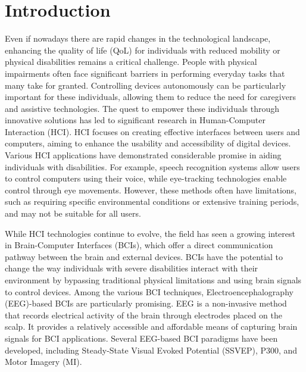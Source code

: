 \chapter{Introduction}\label{ch:introduction}
Even if nowadays there are rapid changes in the technological landscape, enhancing the quality of life (QoL) for individuals with reduced mobility or physical disabilities remains a critical challenge. 
People with physical impairments often face significant barriers in performing everyday tasks that many take for granted. 
Controlling devices autonomously can be particularly important for these individuals, allowing them to reduce the need for caregivers and assistive technologies.
The quest to empower these individuals through innovative solutions has led to significant research in Human-Computer Interaction (HCI).
HCI focuses on creating effective interfaces between users and computers, aiming to enhance the usability and accessibility of digital devices. 
Various HCI applications have demonstrated considerable promise in aiding individuals with disabilities. 
For example, speech recognition systems allow users to control computers using their voice, while eye-tracking technologies enable control through eye movements. 
However, these methods often have limitations, such as requiring specific environmental conditions or extensive training periods, and may not be suitable for all users.

While HCI technologies continue to evolve, the field has seen a growing interest in Brain-Computer Interfaces (BCIs), which offer a direct communication pathway between the brain and external devices. 
BCIs have the potential to change the way individuals with severe disabilities interact with their environment by bypassing traditional physical limitations and using brain signals to control devices.
Among the various BCI techniques, Electroencephalography (EEG)-based BCIs are particularly promising. 
EEG is a non-invasive method that records electrical activity of the brain through electrodes placed on the scalp. 
It provides a relatively accessible and affordable means of capturing brain signals for BCI applications. 
Several EEG-based BCI paradigms have been developed, including Steady-State Visual Evoked Potential (SSVEP), P300, and Motor Imagery (MI).

